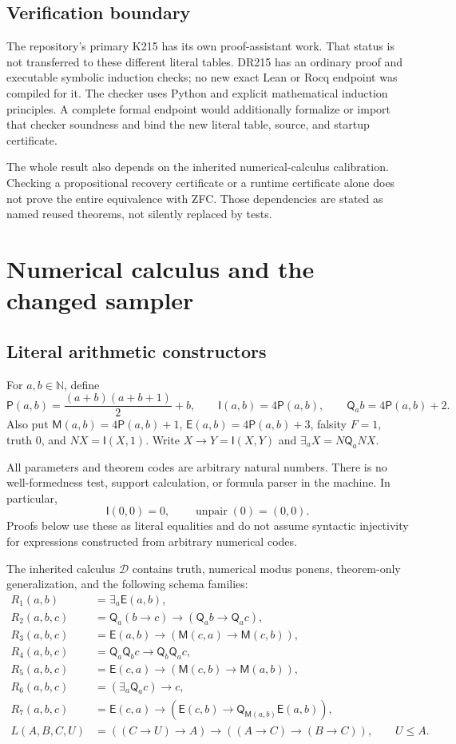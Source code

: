\documentclass[11pt,a4paper]{article}
\theoremstyle{definition}
\newcommand{\N}{\mathbb N}
\newcommand{\pair}{\mathsf P}
\newcommand{\imp}{\mathsf I}
\newcommand{\qnt}{\mathsf Q}
\newcommand{\mem}{\mathsf M}
\newcommand{\eqn}{\mathsf E}
\newcommand{\calD}{\mathcal D}
\numberwithin{equation}{section}
\begin{document}
\subsection{Verification boundary}

The repository's primary K215 has its own proof-assistant work. That
status is not transferred to these different literal tables. DR215 has
an ordinary proof and executable symbolic induction checks; no new exact
Lean or Rocq endpoint was compiled for it. The checker uses Python and
explicit mathematical induction principles. A complete formal endpoint
would additionally formalize or import that checker soundness and bind
the new literal table, source, and startup certificate.

The whole result also depends on the inherited numerical-calculus
calibration. Checking a propositional recovery certificate or a runtime
certificate alone does not prove the entire equivalence with ZFC. Those
dependencies are stated as named reused theorems, not silently replaced
by tests.

\section{Numerical calculus and the changed sampler}
\label{sec:calculus}

\subsection{Literal arithmetic constructors}

For $a,b\in\N$, define
\[
 \pair(a,b)=\frac{(a+b)(a+b+1)}2+b,
 \qquad \imp(a,b)=4\pair(a,b),
 \qquad \qnt_a b=4\pair(a,b)+2.
\]
Also put $\mem(a,b)=4\pair(a,b)+1$,
$\eqn(a,b)=4\pair(a,b)+3$, falsity $F=1$, truth $0$, and
$NX=\imp(X,1)$. Write $X\to Y=\imp(X,Y)$ and
$\exists_a X=N\qnt_a NX$.

All parameters and theorem codes are arbitrary natural numbers. There
is no well-formedness test, support calculation, or formula parser in
the machine. In particular,
\[
 \imp(0,0)=0,\qquad\operatorname{unpair}(0)=(0,0).
\]
Proofs below use these as literal equalities and do not assume syntactic
injectivity for expressions constructed from arbitrary numerical codes.

The inherited calculus $\calD$ contains truth, numerical modus ponens,
theorem-only generalization, and the following schema families:
\begin{align*}
 R_1(a,b)&=\exists_a\eqn(a,b),\\
 R_2(a,b,c)&=\qnt_a(b\to c)\to(\qnt_a b\to\qnt_a c),\\
 R_3(a,b,c)&=\eqn(a,b)\to(\mem(c,a)\to\mem(c,b)),\\
 R_4(a,b,c)&=\qnt_a\qnt_b c\to\qnt_b\qnt_a c,\\
 R_5(a,b,c)&=\eqn(c,a)\to(\mem(c,b)\to\mem(a,b)),\\
 R_6(a,b,c)&=(\exists_a\qnt_a c)\to c,\\
 R_7(a,b,c)&=\eqn(c,a)\to
       (\eqn(c,b)\to\qnt_{\mem(a,b)}\eqn(a,b)),\\
 L(A,B,C,U)&=((C\to U)\to A)\to((A\to C)\to(B\to C)),
       \qquad U\le A.
\end{align*}
\end{document}
